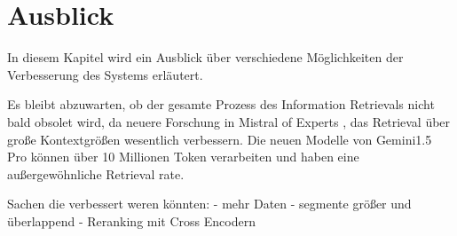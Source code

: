 \chapter{Ausblick}\label{ch:outlook}

In diesem Kapitel wird ein Ausblick über verschiedene Möglichkeiten der Verbesserung des Systems erläutert.

Es bleibt abzuwarten, ob der gesamte Prozess des Information Retrievals nicht bald obsolet wird, da neuere Forschung in Mistral of Experts \cite{jiang2024}, das Retrieval über große Kontextgrößen wesentlich verbessern.
Die neuen Modelle von Gemini1.5 Pro können über 10 Millionen Token verarbeiten und haben eine außergewöhnliche Retrieval rate.


Sachen die verbessert weren könnten:
- mehr Daten
- segmente größer und überlappend
- Reranking mit Cross Encodern